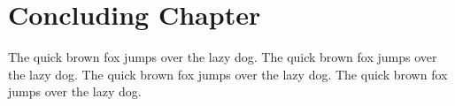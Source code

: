 
\chapter{Concluding Chapter}

The quick brown fox jumps over the lazy dog. 
The quick brown fox jumps over the lazy dog. 
The quick brown fox jumps over the lazy dog. 
The quick brown fox jumps over the lazy dog. 